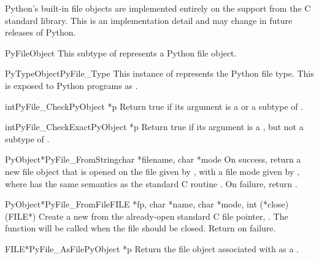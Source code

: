 Python's built-in file objects are implemented entirely on the
 support from the C standard library.  This is an
implementation detail and may change in future releases of Python.

\begin{ctypedesc}{PyFileObject}
  This subtype of  represents a Python file object.
\end{ctypedesc}

\begin{cvardesc}{PyTypeObject}{PyFile_Type}
  This instance of  represents the Python file
  type.  This is exposed to Python programs as .
\end{cvardesc}

\begin{cfuncdesc}{int}{PyFile_Check}{PyObject *p}
  Return true if its argument is a  or a subtype
  of .
\end{cfuncdesc}

\begin{cfuncdesc}{int}{PyFile_CheckExact}{PyObject *p}
  Return true if its argument is a , but not a
  subtype of .
\end{cfuncdesc}

\begin{cfuncdesc}{PyObject*}{PyFile_FromString}{char *filename, char *mode}
  On success, return a new file object that is opened on the file
  given by , with a file mode given by , where
   has the same semantics as the standard C routine
  .  On failure, return \NULL{}.
\end{cfuncdesc}

\begin{cfuncdesc}{PyObject*}{PyFile_FromFile}{FILE *fp,
                                              char *name, char *mode,
                                              int (*close)(FILE*)}
  Create a new  from the already-open standard C
  file pointer, .  The function  will be called
  when the file should be closed.  Return \NULL{} on failure.
\end{cfuncdesc}

\begin{cfuncdesc}{FILE*}{PyFile_AsFile}{PyObject *p}
  Return the file object associated with  as a .
\end{cfuncdesc}

